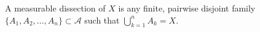A measurable dissection of $X$ is any finite, pairwise disjoint family $\{A_1, A_2, \ldots, A_n\} \subset \mathcal{A}$ such that $\bigcup_{k=1}^{n} A_k = X$.